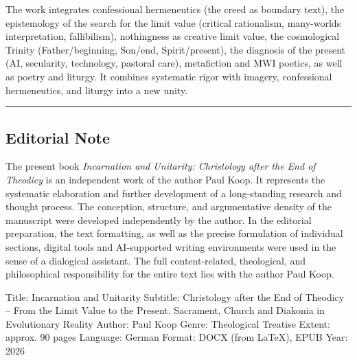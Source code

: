 \documentclass[
  english,
]{article}
\begin{document}
The work integrates confessional hermeneutics (the creed as boundary
text), the epistemology of the search for the limit value (critical
rationalism, many-worlds interpretation, fallibilism), nothingness as
creative limit value, the cosmological Trinity (Father/beginning,
Son/end, Spirit/present), the diagnosis of the present (AI, secularity,
technology, pastoral care), metafiction and MWI poetics, as well as
poetry and liturgy. It combines systematic rigor with imagery,
confessional hermeneutics, and liturgy into a new unity.

\begin{center}\rule{0.5\linewidth}{0.5pt}\end{center}

\subsection{Editorial Note}\label{editorial-note}

The present book \emph{Incarnation and Unitarity: Christology after the
End of Theodicy} is an independent work of the author Paul Koop. It
represents the systematic elaboration and further development of a
long-standing research and thought process. The conception, structure,
and argumentative density of the manuscript were developed independently
by the author. In the editorial preparation, the text formatting, as
well as the precise formulation of individual sections, digital tools
and AI-supported writing environments were used in the sense of a
dialogical assistant. The full content-related, theological, and
philosophical responsibility for the entire text lies with the author
Paul Koop.

Title: Incarnation and Unitarity Subtitle: Christology after the End of
Theodicy -- From the Limit Value to the Present. Sacrament, Church and
Diakonia in Evolutionary Reality Author: Paul Koop Genre: Theological
Treatise Extent: approx. 90 pages Language: German Format: DOCX (from
LaTeX), EPUB Year: 2026
\end{document}
